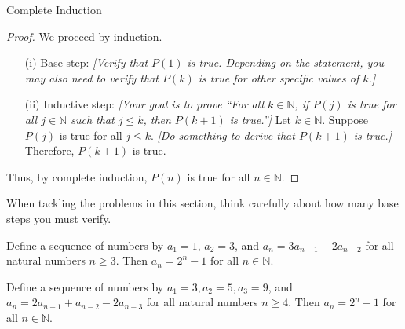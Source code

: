 \begin{section}{Complete Induction}
\begin{skeleton}
\begin{mdframed}[style=skeleton]
\begin{proof}
We proceed by induction.
\begin{enumerate}\setlength{\itemsep}{0in}
\item[(i)] Base step: \emph{[Verify that $P(1)$ is true.  Depending on the statement, you may also need to verify that $P(k)$ is true for other specific values of $k$.]}

\item[(ii)] Inductive step:  \emph{[Your goal is to prove ``For all $k\in\mathbb{N}$, if $P(j)$ is true for all $j\in \mathbb{N}$ such that $j \leq k$, then $P(k+1)$ is true.'']} Let $k \in \mathbb{N}$.  Suppose $P(j)$ is true for all $j \leq k$. \emph{[Do something to derive that $P(k+1)$ is true.]} Therefore, $P(k+1)$ is true.
\end{enumerate}
Thus, by complete induction, $P(n)$ is true for all $n \in\mathbb{N}$.
\end{proof}
\end{mdframed}
\end{skeleton}

When tackling the problems in this section, think carefully about how many base steps you must verify.

\begin{theorem}
Define a sequence of numbers by $a_1 = 1$, $a_2 = 3$, and $a_n = 3a_{n-1} - 2a_{n-2}$ for all natural numbers $n \geq 3$.  Then $a_n = 2^n - 1$ for all $n \in \mathbb{N}$.  
\end{theorem}

\begin{theorem}
Define a sequence of numbers by $a_1 = 3, a_2 = 5, a_3 = 9$, and $a_n = 2a_{n-1} + a_{n-2}-2a_{n-3}$ for all natural numbers $n \geq 4$.  Then $a_n = 2^n + 1$ for all $n \in \mathbb{N}$.  
\end{theorem}




\end{section}

